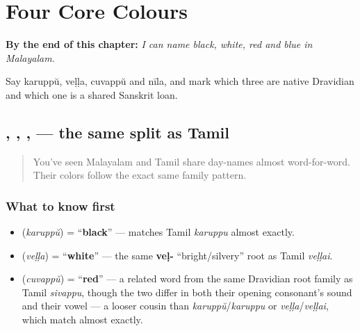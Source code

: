 
\chapter{Four Core Colours}
\label{ch:ml-core-colours}

\begin{chapteropening}
\textbf{By the end of this chapter:} \emph{I can name black, white, red and blue in Malayalam.}

Say karuppŭ, veḷḷa, cuvappŭ and nīla, and mark which three are native Dravidian and which one is a shared Sanskrit loan.
\end{chapteropening}

\section[\texorpdfstring{\ml{കറുപ്പ്} \ml{വെള്ള} \ml{ചുവപ്പ്} \ml{നീല} (karuppŭ veḷḷa …)}{കറുപ്പ് വെള്ള ചുവപ്പ് നീല (karuppŭ veḷḷa …)}]{, , ,  — the same split as Tamil}

\label{lesson:ML-C11-nirangal}



\begin{quote}
You've seen Malayalam and Tamil share day-names almost word-for-word. Their colors follow the exact same family pattern.
\end{quote}

\subsection*{What to know first}
\begin{itemize}
\raggedright
  \item \textbf{} (\emph{karuppŭ}) = \textquotedblleft{}\textbf{black}\textquotedblright{} — matches Tamil \emph{karuppu} almost exactly.
  \item \textbf{} (\emph{veḷḷa}) = \textquotedblleft{}\textbf{white}\textquotedblright{} — the same \textbf{veḷ-} \textquotedblleft{}bright/silvery\textquotedblright{} root as Tamil \emph{veḷḷai}.
  \item \textbf{} (\emph{cuvappŭ}) = \textquotedblleft{}\textbf{red}\textquotedblright{} — a related word from the same Dravidian root family as Tamil \emph{sivappu}, though the two differ in both their opening consonant's sound and their vowel — a looser cousin than \emph{karuppŭ}/\emph{karuppu} or \emph{veḷḷa}/\emph{veḷḷai}, which match almost exactly.
\end{itemize}

